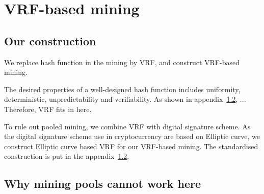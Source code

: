 \section{VRF-based mining}

\subsection{Our construction}

We replace hash function in the mining by VRF, and construct VRF-based mining.

The desired properties of a well-designed hash function includes uniformity, deterministic, unpredictability and verifiability.
As shown in appendix~\ref{}, ...
Therefore, VRF fits in here.

To rule out pooled mining, we combine VRF with digital signature scheme.
As the digital signature scheme use in cryptocurrency are based on Elliptic curve, we construct Elliptic curve based VRF for our VRF-based mining.
The standardised construction is put in the appendix~\ref{}.

\subsection{Why mining pools cannot work here}



